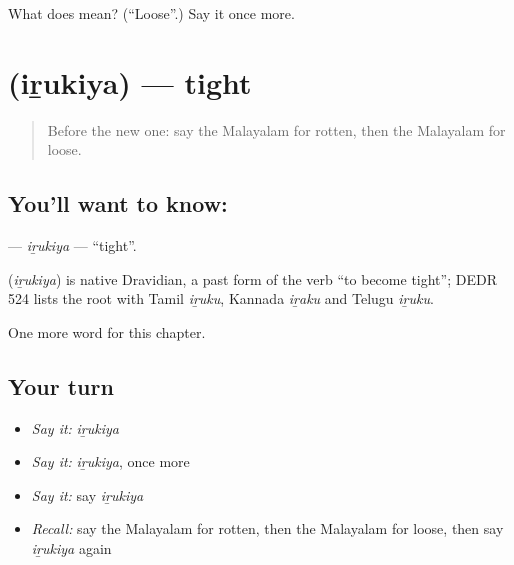 \begin{tcolorbox}[breakable,colback=teal!4,colframe=teal!35!black,title={Before you move on}]
What does  mean? (\textquotedblleft{}Loose\textquotedblright{}.) Say it once more.
\end{tcolorbox}
\section[\texorpdfstring{\ml{ഇറുകിയ} (iṟukiya)}{ഇറുകിയ (iṟukiya)}]{ (iṟukiya) — tight}

\label{lesson:ML-C203-irukiya}



\begin{quote}
Before the new one: say the Malayalam for rotten, then the Malayalam for loose.
\end{quote}

\subsection*{You'll want to know: }
\textbf{} — \emph{iṟukiya} — \textquotedblleft{}tight\textquotedblright{}.

\begin{cousinweb}
\textbf{} (\emph{iṟukiya}) is native Dravidian, a past form of the verb \textquotedblleft{}to become tight\textquotedblright{}; DEDR 524 lists the root with Tamil \emph{iṟuku}, Kannada \emph{iṟaku} and Telugu \emph{iṟuku}.
\end{cousinweb}

\begin{grammarlens}[title={What you've built}]
One more word for this chapter.
\end{grammarlens}

\subsection*{Your turn}
\begin{itemize}
\raggedright
  \item \emph{Say it:} \emph{iṟukiya}
  \item \emph{Say it:} \emph{iṟukiya}, once more
  \item \emph{Say it:} say \emph{iṟukiya}
  \item \emph{Recall:} say the Malayalam for rotten, then the Malayalam for loose, then say \emph{iṟukiya} again
\end{itemize}

